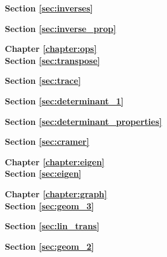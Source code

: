 \begin{adjustwidth}{-70pt}{-70pt}
\begin{multicols}{3}
\textbf{Section \ref{sec:inverses}}



\textbf{Section \ref{sec:inverse_prop}}



{\Large \bf Chapter \ref{chapter:ops}}\\

\textbf{Section \ref{sec:transpose}}



\textbf{Section \ref{sec:trace}}



\textbf{Section \ref{sec:determinant_1}}



\textbf{Section \ref{sec:determinant_properties}}



\textbf{Section \ref{sec:cramer}}



{\Large \bf Chapter \ref{chapter:eigen}}\\

\textbf{Section \ref{sec:eigen}}



{\Large \bf Chapter \ref{chapter:graph}}\\

\textbf{Section \ref{sec:geom_3}}



\textbf{Section \ref{sec:lin_trans}}


\textbf{Section \ref{sec:geom_2}}


\end{multicols}
\end{adjustwidth}
\normalsize